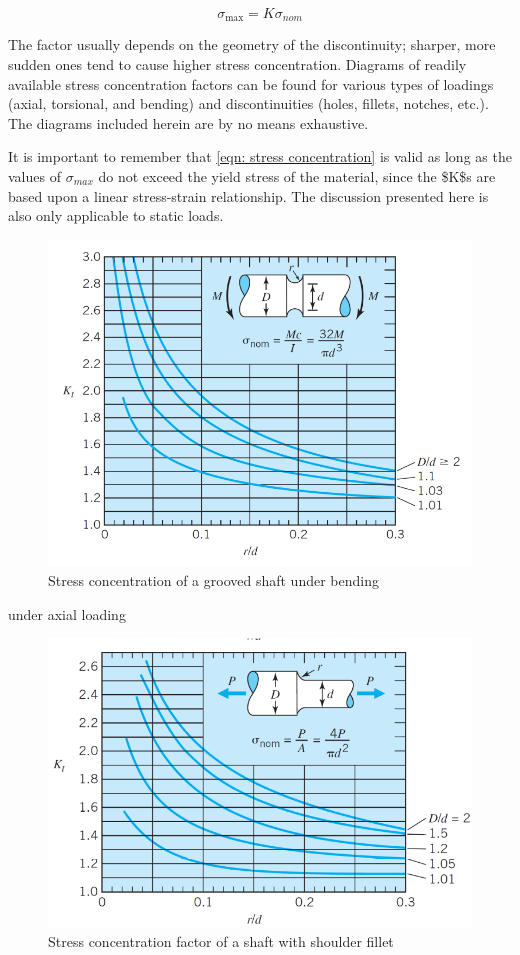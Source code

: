 \documentclass[a4paper,openany,nobib]{tufte-book}
\begin{document}
$$\sigma _{\max } = K\sigma _{nom}$$

The factor usually depends on the geometry of the discontinuity;
sharper, more sudden ones tend to cause higher stress concentration.
Diagrams of readily available stress concentration factors can be found
for various types of loadings (axial, torsional, and bending) and
discontinuities (holes, fillets, notches, etc.). The diagrams included
herein are by no means exhaustive.

It is important to remember that
\ref{eqn: stress concentration} is valid as
long as the values of \(\sigma_{max}\) do not exceed the yield stress of
the material, since the \$K\$s are based upon a linear stress-strain
relationship. The discussion presented here is also only applicable to
static loads.


\cite{juvinall2006fundamentals}
\begin{figure}[htbp]
\centering
\includegraphics[width=.9\linewidth]{pictures/Static-body-load-analysis/stress-conc-grooved-shaft.png}
\caption{Stress concentration of a grooved shaft under bending}
\end{figure}


under axial loading \cite{juvinall2006fundamentals}
\begin{figure}[htbp]
\centering
\includegraphics[width=.9\linewidth]{pictures/Static-body-load-analysis/stress-conc-shaft-shoulder-fillet.png}
\caption{Stress concentration factor of a shaft with shoulder fillet}
\end{figure}
\end{document}
